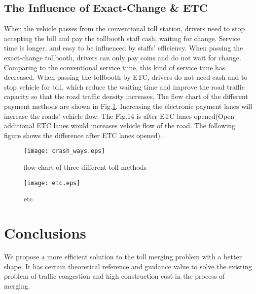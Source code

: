 \documentclass{mcmthesis}
\begin{document}
\subsection{The Influence of Exact-Change \& ETC}
When the vehicle passes from the conventional toll station, drivers need to stop accepting the bill and pay the tollbooth staff cash, waiting for change. Service time is longer, and easy to be influenced by staffs' efficiency.
When passing the exact-change tollbooth, drivers can only pay coins and do not wait for change. Comparing to the conventional service time, this kind of service time has decreased. 
When passing the tollbooth by ETC, drivers do not need cash and to stop vehicle for bill, which reduce the waiting time and improve the road traffic capacity so that the road traffic density increases\cite{spiliopoulou2009toll}.
The flow chart of the different payment methods are shown in Fig.\ref{fig:crash_ways}.
Increasing the electronic payment lanes will increase the roads' vehicle flow. The Fig.14 is after ETC lanes opened(Open additional ETC lanes would increases vehicle flow of the road. The following figure shows the difference after ETC lanes opened).


\begin{figure}
	\centering
	\texttt{[image: crash\_ways.eps]}
	\caption{flow chart of three different toll methods}
	\label{fig:crash_ways}
\end{figure}

\begin{figure}[!htbp]
	\small
	\centering
	\texttt{[image: etc.eps]}
	\caption{etc} 
	\label{fig:etc}
\end{figure}
\section{Conclusions}
We propose a more efficient solution to the toll merging problem with a better shape. It has certain theoretical reference and guidance value to solve the existing problem of traffic congestion and high construction cost in the process of merging.
\end{document}
